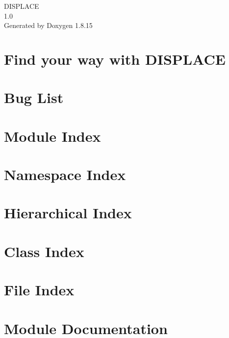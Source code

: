 \let\mypdfximage\pdfximage\def\pdfximage{\immediate\mypdfximage}\documentclass[twoside]{book}
\newcommand{\+}{\discretionary{\mbox{\scriptsize$\hookleftarrow$}}{}{}}
\newcommand{\clearemptydoublepage}{%
  \newpage{\pagestyle{empty}\cleardoublepage}%
}
\begin{document}
\hypersetup{pageanchor=false,
             bookmarksnumbered=true,
             pdfencoding=unicode
            }
\begin{titlepage}
\vspace*{7cm}
\begin{center}%
{\Large D\+I\+S\+P\+L\+A\+CE \\[1ex]\large 1.\+0 }\\
\vspace*{1cm}
{\large Generated by Doxygen 1.8.15}\\
\end{center}
\end{titlepage}
\clearemptydoublepage
{}
\tableofcontents
\clearemptydoublepage
{}
\hypersetup{pageanchor=true}

\chapter{Find your way with D\+I\+S\+P\+L\+A\+CE}
\label{index}\hypertarget{index}{}
\chapter{Bug List}
\label{bug}

\chapter{Module Index}

\chapter{Namespace Index}

\chapter{Hierarchical Index}

\chapter{Class Index}

\chapter{File Index}

\chapter{Module Documentation}

\end{document}
